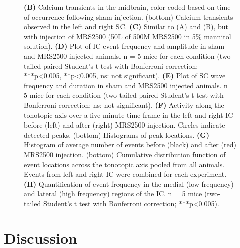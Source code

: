 \documentclass[9pt,lineno]{elife}
\begin{document}
\begin{figure} [t!]
\begin{fullwidth}
\caption{\textbf{(B)} Calcium transients in the midbrain, color-coded based on time of occurrence following sham injection. (bottom) Calcium transients observed in the left and right SC. 
\textbf{(C)} Similar to (A) and (B), but with injection of MRS2500 (50\textmu L of 500\textmu M MRS2500 in 5\% mannitol solution). 
\textbf{(D)} Plot of IC event frequency and amplitude in sham and MRS2500 injected animals. n = 5 mice for each condition (two-tailed paired Student’s t test with Bonferroni correction; ***p<0.005, **p<0.005, ns: not significant).
\textbf{(E)} Plot of SC wave frequency and duration in sham and MRS2500 injected animals. n = 5 mice for each condition (two-tailed paired Student’s t test with Bonferroni correction; ns: not significant).
\textbf{(F)} Activity along the tonotopic axis over a five-minute time frame in the left and right IC before (left) and after (right) MRS2500 injection. Circles indicate detected peaks. (bottom) Histograms of peak locations.
\textbf{(G)} Histogram of average number of events before (black) and after (red) MRS2500 injection. (bottom) Cumulative distribution function of event locations across the tonotopic axis pooled from all animals. Events from left and right IC were combined for each experiment.
\textbf{(H)} Quantification of event frequency in the medial (low frequency) and lateral (high frequency) regions of the IC. n = 5 mice (two-tailed Student's t test with Bonferroni correction; ***p<0.005).}
\end{fullwidth}
\end{figure}

\section{Discussion}
\end{document}
